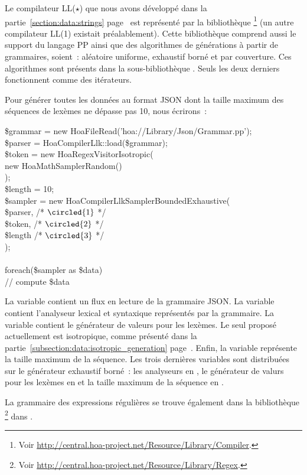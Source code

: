 Le compilateur LL($\star$) que nous avons développé dans la
partie~\ref{section:data:strings} page~\pageref{section:data:strings} est
représenté par la bibliothèque
\footnote{Voir
\url{http://central.hoa-project.net/Resource/Library/Compiler}.} (un autre
compilateur LL(1) existait préalablement). Cette bibliothèque comprend aussi le
support du langage PP ainsi que des algorithmes de générations à partir de
grammaires, soient~: aléatoire uniforme, exhaustif borné et par couverture. Ces
algorithmes sont présents dans la sous-bibliothèque
.  Seuls les deux
derniers fonctionnent comme des itérateurs.

\begin{example}

Pour générer toutes les données au format JSON dont la taille maximum des
séquences de lexèmes ne dépasse pas 10, nous écrirons~:
%
\begin{pre}
\$grammar = new Hoa\bslash{}File\bslash{}Read('hoa://Library/Json/Grammar.pp'); \\
\$parser  = Hoa\bslash{}Compiler\bslash{}Llk::load(\$grammar); \\
\$token   = new Hoa\bslash{}Regex\bslash{}Visitor\bslash{}Isotropic( \\
    new Hoa\bslash{}Math\bslash{}Sampler\bslash{}Random() \\
); \\
\$length  = 10; \\
\$sampler = new Hoa\bslash{}Compiler\bslash{}Llk\bslash{}Sampler\bslash{}BoundedExhaustive( \\
    \$parser, /* \(\circled{1}\) */ \\
    \$token,  /* \(\circled{2}\) */ \\
    \$length  /* \(\circled{3}\) */ \\
); \\
 \\
foreach(\$sampler as \$data) \\
    // compute \$data
\end{pre}
%
La variable  contient un flux en lecture de la grammaire JSON.
La variable  contient l'analyseur lexical et syntaxique
représentés par la grammaire. La variable  contient le générateur
de valeurs pour les lexèmes. Le seul proposé actuellement est isotropique, comme
présenté dans la partie~\ref{subsection:data:isotropic_generation}
page~\pageref{subsection:data:isotropic_generation}. Enfin, la variable
 représente la taille maximum de la séquence. Les trois dernières
variables sont distribuées sur le générateur exhaustif borné~: les analyseurs en
, le générateur de valurs pour les lexèmes en  et la
taille maximum de la séquence en .

\end{example}

La grammaire des expressions régulières se trouve également dans la bibliothèque
\footnote{Voir
\url{http://central.hoa-project.net/Resource/Library/Regex}.} dans
.
